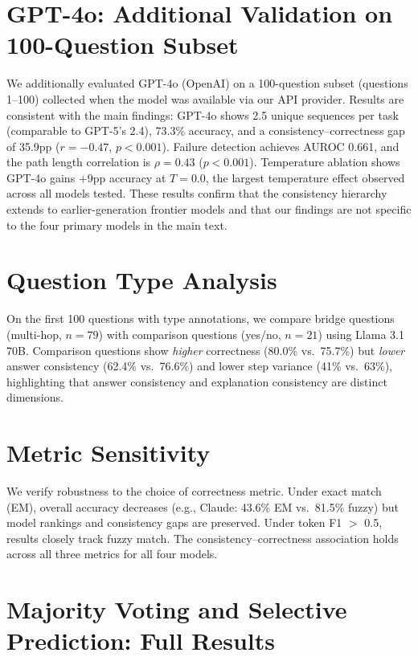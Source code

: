 \documentclass{article}
\begin{document}
\section{GPT-4o: Additional Validation on 100-Question Subset}
\label{app:gpt4o}

We additionally evaluated GPT-4o (OpenAI) on a 100-question subset (questions 1--100) collected when the model was available via our API provider. Results are consistent with the main findings: GPT-4o shows 2.5 unique sequences per task (comparable to GPT-5's 2.4), 73.3\% accuracy, and a consistency--correctness gap of 35.9pp ($r=-0.47$, $p<0.001$). Failure detection achieves AUROC 0.661, and the path length correlation is $\rho=0.43$ ($p<0.001$). Temperature ablation shows GPT-4o gains $+$9pp accuracy at $T\!=\!0.0$, the largest temperature effect observed across all models tested. These results confirm that the consistency hierarchy extends to earlier-generation frontier models and that our findings are not specific to the four primary models in the main text.

\section{Question Type Analysis}
\label{app:qtype}

On the first 100 questions with type annotations, we compare bridge questions (multi-hop, $n=79$) with comparison questions (yes/no, $n=21$) using Llama 3.1 70B. Comparison questions show \emph{higher} correctness (80.0\% vs.\ 75.7\%) but \emph{lower} answer consistency (62.4\% vs.\ 76.6\%) and lower step variance (41\% vs.\ 63\%), highlighting that answer consistency and explanation consistency are distinct dimensions.

\section{Metric Sensitivity}
\label{app:metrics}

We verify robustness to the choice of correctness metric. Under exact match (EM), overall accuracy decreases (e.g., Claude: 43.6\% EM vs.\ 81.5\% fuzzy) but model rankings and consistency gaps are preserved. Under token F1 $>$ 0.5, results closely track fuzzy match. The consistency--correctness association holds across all three metrics for all four models.

\section{Majority Voting and Selective Prediction: Full Results}
\label{app:vote}
\end{document}
